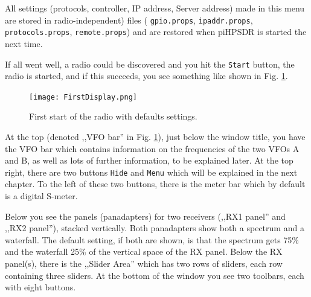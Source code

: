 \documentclass[12pt]{book}
\def\rett#1{\texttt{\color{red}#1}}
\def\pH{pi\-HPSDR\xspace}
\begin{document}
All settings (protocols, controller, IP address, Server address) made in this menu are stored in
radio-independent) files ( \texttt{gpio.props}, \texttt{ipaddr.props}, \texttt{protocols.props},
\texttt{remote.props})
and are restored when \pH is started the next time.

If all went well, a radio could be discovered and you hit the \rett{Start} button, the radio is started, and
if this succeeds, you see something like shown in Fig. \ref{fig:FirstDisplay}.

\begin{figure}
\center
\texttt{[image: FirstDisplay.png]}
\caption{First start of the radio with defaults settings.}
\label{fig:FirstDisplay}
\end{figure}

At the top (denoted ,,VFO bar'' in Fig. \ref{fig:FirstDisplay}),
just below the window title, you have the VFO bar which contains information on the frequencies of the two
VFOs A and B,
as well as lots of further information, to be explained later. At the top right, there are two buttons
\rett{Hide}
and \rett{Menu} which will be explained in the next chapter. To the left of these two buttons, there is the
meter bar which by default is a digital S-meter.

Below you see the panels (panadapters) for two receivers (,,RX1 panel'' and ,,RX2 panel''), stacked vertically.
Both panadapters show both a spectrum and a waterfall. The default setting, if both are shown, is that
the spectrum gets 75\% and the waterfall 25\% of the vertical space of the RX panel.
Below the RX panel(s), there is the ,,Slider Area'' which has two rows of sliders, each row containing
three sliders.
At the bottom of the window you see two toolbars, each with eight buttons.
\end{document}
